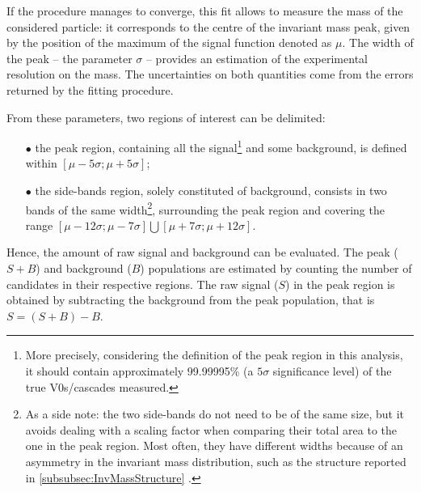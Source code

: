 If the procedure manages to converge, this fit allows to measure the mass of the considered particle: it corresponds to the centre of the invariant mass peak, given by the position of the maximum of the signal function denoted as $\mu$. The width of the peak -- the parameter $\sigma$ -- provides an estimation of the experimental resolution on the mass. The uncertainties on both quantities come from the errors returned by the fitting procedure.

From these parameters, two regions of interest can be delimited:
\begin{itemize}
\item[$\bullet$] the peak region, containing all the signal\footnote{More precisely, considering the definition of the peak region in this analysis, it should contain approximately 99.99995\% (\ie a $5 \sigma$ significance level) of the true V0s/cascades measured.} and some background, is defined within $\left[ \mu - 5 \sigma ; \mu + 5 \sigma \right]$;
\item[$\bullet$] the side-bands region, solely constituted of background, consists in two bands of the same width\footnote{As a side note: the two side-bands do not need to be of the same size, but it avoids dealing with a scaling factor when comparing their total area to the one in the peak region. Most often, they have different widths because of an asymmetry in the invariant mass distribution, such as the structure reported in \Sec\ref{subsubsec:InvMassStructure} \cite{alicecollaborationProductionLightflavorHadrons2020}.}, surrounding the peak region and covering the range $\left[ \mu - 12 \sigma ; \mu - 7 \sigma \right] \bigcup \left[ \mu + 7 \sigma ; \mu + 12 \sigma \right]$.
\end{itemize}
Hence, the amount of raw signal and background can be evaluated. The peak ($S+B$) and background ($B$) populations are estimated by counting the
number of candidates in their respective regions. The raw signal ($S$) in the peak region is obtained by subtracting the background from the peak population, that is $S = (S+B) - B$.

